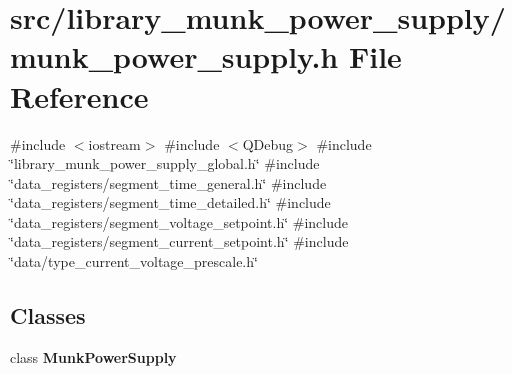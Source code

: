 \section{src/library\+\_\+munk\+\_\+power\+\_\+supply/munk\+\_\+power\+\_\+supply.h File Reference}
\label{munk__power__supply_8h}
{\ttfamily \#include $<$iostream$>$}\newline
{\ttfamily \#include $<$Q\+Debug$>$}\newline
{\ttfamily \#include \char`\"{}library\+\_\+munk\+\_\+power\+\_\+supply\+\_\+global.\+h\char`\"{}}\newline
{\ttfamily \#include \char`\"{}data\+\_\+registers/segment\+\_\+time\+\_\+general.\+h\char`\"{}}\newline
{\ttfamily \#include \char`\"{}data\+\_\+registers/segment\+\_\+time\+\_\+detailed.\+h\char`\"{}}\newline
{\ttfamily \#include \char`\"{}data\+\_\+registers/segment\+\_\+voltage\+\_\+setpoint.\+h\char`\"{}}\newline
{\ttfamily \#include \char`\"{}data\+\_\+registers/segment\+\_\+current\+\_\+setpoint.\+h\char`\"{}}\newline
{\ttfamily \#include \char`\"{}data/type\+\_\+current\+\_\+voltage\+\_\+prescale.\+h\char`\"{}}\newline
\subsection*{Classes}
\begin{DoxyCompactItemize}
\item 
class \textbf{ Munk\+Power\+Supply}
\end{DoxyCompactItemize}
